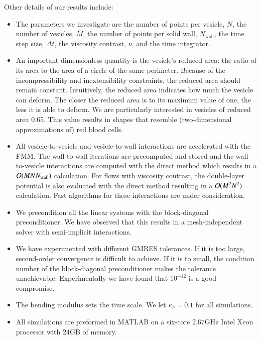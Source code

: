 Other details of our results include:
\begin{itemize}
\item The parameters we investigate are the number of points per
vesicle, $N$, the number of vesicles, $M$, the number of points per
solid wall, $N_{\mathrm{wall}}$, the time step size, $\Delta t$, the
viscosity contrast, $\nu$, and the time integrator.

\item An important dimensionless quantity is the vesicle's reduced
area: the ratio of its area to the area of a circle of the same
perimeter.  Because of the incompressibility and inextensibility
constraints, the reduced area should remain constant.  Intuitively, the
reduced area indicates how much the vesicle can deform.  The closer the
reduced area is to its maximum value of one, the less it is able to
deform.  We are particularly interested in vesicles of reduced area
0.65. This value results in shapes that resemble (two-dimensional
approximations of) red blood cells.

\item All vesicle-to-vesicle and vesicle-to-wall interactions are
accelerated with the FMM.  The wall-to-wall iterations are precomputed
and stored and the wall-to-vesicle interactions are computed with the
direct method which results in a $\mathcal{O}(MNN_{\mathrm{wall}})$
calculation.  For flows with viscosity contrast, the double-layer
potential is also evaluated with the direct method resulting in a
$\mathcal{O}(M^{2}N^{2})$ calculation.  Fast algorithms for these
interactions are under consideration.

\item We precondition all the linear systems with the block-diagonal
preconditioner.  We have observed that this results in a
mesh-independent solver with semi-implicit interactions.

\item We have experimented with different GMRES tolerances.  If it is
too large, second-order convergence is difficult to achieve.  If it is
to small, the condition number of the block-diagonal preconditioner
makes the tolerance unachievable.  Experimentally we have found that
$10^{-12}$ is a good compromise.

\item The bending modulus sets the time scale.  We let $\kappa_{b}=0.1$
for all simulations.

\item All simulations are preformed in MATLAB on a six-core 2.67GHz
Intel Xeon processor with 24GB of memory. 
\end{itemize}

